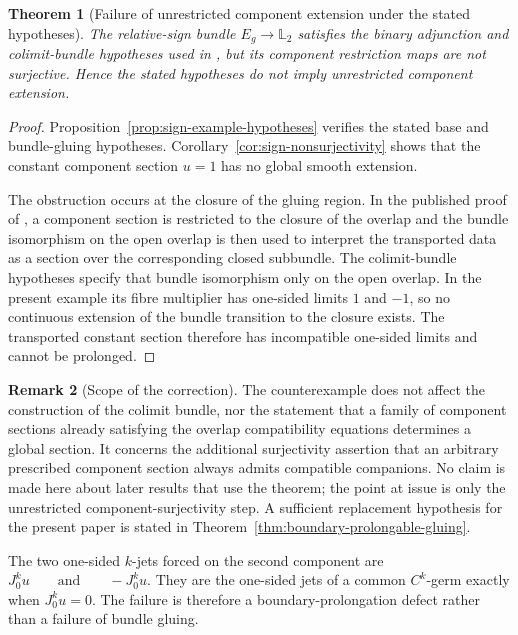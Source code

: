 \documentclass[11pt]{article}
\theoremstyle{plain}
\newtheorem{theorem}{Theorem}[section]
\theoremstyle{definition}
\newtheorem{remark}[theorem]{Remark}
\newcommand{\Ltwo}{\mathbb{L}_{2}}
\begin{document}
\begin{theorem}[Failure of unrestricted component extension under the stated hypotheses]
\label{thm:oconnell-extension-counterexample}
The relative-sign bundle \(E_g\to\Ltwo\) satisfies the binary adjunction and
colimit-bundle hypotheses used in \cite[Theorem~2.5]{OConnell2024Bundles},
but its component restriction maps are not surjective. Hence the stated hypotheses do not imply unrestricted component extension.
\end{theorem}

\begin{proof}
Proposition~\ref{prop:sign-example-hypotheses} verifies the stated base and
bundle-gluing hypotheses. Corollary~\ref{cor:sign-nonsurjectivity} shows that
the constant component section \(u=1\) has no global smooth extension.

The obstruction occurs at the closure of the gluing region. In the published
proof of \cite[Theorem~2.5]{OConnell2024Bundles}, a component section is
restricted to the closure of the overlap and the bundle isomorphism on the
open overlap is then used to interpret the transported data as a section over
the corresponding closed subbundle. The colimit-bundle hypotheses specify
that bundle isomorphism only on the open overlap. In the present example its
fibre multiplier has one-sided limits \(1\) and \(-1\), so no continuous
extension of the bundle transition to the closure exists. The transported
constant section therefore has incompatible one-sided limits and cannot be
prolonged.
\end{proof}

\begin{remark}[Scope of the correction]
\label{rem:oconnell-correction-scope}
The counterexample does not affect the construction of the colimit bundle, nor
the statement that a family of component sections already satisfying the
overlap compatibility equations determines a global section. It concerns the
additional surjectivity assertion that an arbitrary prescribed component
section always admits compatible companions. No claim is made here about later results that use the theorem; the point at issue is only the unrestricted component-surjectivity step. A sufficient replacement hypothesis for the present paper is stated in Theorem~\ref{thm:boundary-prolongable-gluing}.
\end{remark}

The two one-sided \(k\)-jets forced on the second component are
\(J_0^k u \qquad\text{and}\qquad -J_0^k u\).
They are the one-sided jets of a common \(C^k\)-germ exactly when
\(J_0^k u=0\).
The failure is therefore a boundary-prolongation defect rather than a
failure of bundle gluing.
\end{document}
